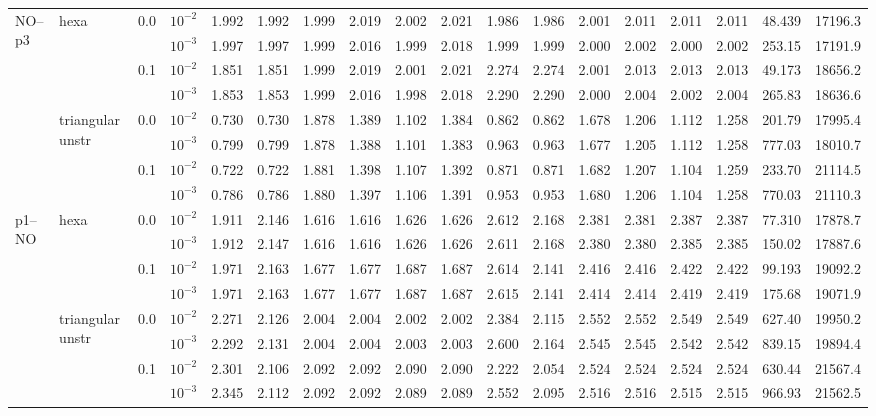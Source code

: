 \begin{longtable}{llclrrrrrrrrrrrrrr}
\multirow{8}{*}{NO--p3} & \multirow{4}{*}{hexa} & \multirow{2}{*}{0.0} & $10^{-2}$ & 1.992 & 1.992 & 1.999 & 2.019 & 2.002 & 2.021 & 1.986 & 1.986 & 2.001 & 2.011 & 2.011 & 2.011 & 48.439 & 17196.3 \\
& & & $10^{-3}$ & 1.997 & 1.997 & 1.999 & 2.016 & 1.999 & 2.018 & 1.999 & 1.999 & 2.000 & 2.002 & 2.000 & 2.002 & 253.15 & 17191.9 \\\cline{3-18}
& & \multirow{2}{*}{0.1} & $10^{-2}$ & 1.851 & 1.851 & 1.999 & 2.019 & 2.001 & 2.021 & 2.274 & 2.274 & 2.001 & 2.013 & 2.013 & 2.013 & 49.173 & 18656.2 \\
& & & $10^{-3}$ & 1.853 & 1.853 & 1.999 & 2.016 & 1.998 & 2.018 & 2.290 & 2.290 & 2.000 & 2.004 & 2.002 & 2.004 & 265.83 & 18636.6 \\\cline{2-18}
& \multirow{4}{*}{triangular unstr} & \multirow{2}{*}{0.0} & $10^{-2}$ & 0.730 & 0.730 & 1.878 & 1.389 & 1.102 & 1.384 & 0.862 & 0.862 & 1.678 & 1.206 & 1.112 & 1.258 & 201.79 & 17995.4 \\
& & & $10^{-3}$ & 0.799 & 0.799 & 1.878 & 1.388 & 1.101 & 1.383 & 0.963 & 0.963 & 1.677 & 1.205 & 1.112 & 1.258 & 777.03 & 18010.7 \\\cline{3-18}
& & \multirow{2}{*}{0.1} & $10^{-2}$ & 0.722 & 0.722 & 1.881 & 1.398 & 1.107 & 1.392 & 0.871 & 0.871 & 1.682 & 1.207 & 1.104 & 1.259 & 233.70 & 21114.5 \\
& & & $10^{-3}$ & 0.786 & 0.786 & 1.880 & 1.397 & 1.106 & 1.391 & 0.953 & 0.953 & 1.680 & 1.206 & 1.104 & 1.258 & 770.03 & 21110.3 \\\hline

\multirow{8}{*}{p1--NO} & \multirow{4}{*}{hexa} & \multirow{2}{*}{0.0} & $10^{-2}$ & 1.911 & 2.146 & 1.616 & 1.616 & 1.626 & 1.626 & 2.612 & 2.168 & 2.381 & 2.381 & 2.387 & 2.387 & 77.310 & 17878.7 \\
& & & $10^{-3}$ & 1.912 & 2.147 & 1.616 & 1.616 & 1.626 & 1.626 & 2.611 & 2.168 & 2.380 & 2.380 & 2.385 & 2.385 & 150.02 & 17887.6 \\\cline{3-18}
& & \multirow{2}{*}{0.1} & $10^{-2}$ & 1.971 & 2.163 & 1.677 & 1.677 & 1.687 & 1.687 & 2.614 & 2.141 & 2.416 & 2.416 & 2.422 & 2.422 & 99.193 & 19092.2 \\
& & & $10^{-3}$ & 1.971 & 2.163 & 1.677 & 1.677 & 1.687 & 1.687 & 2.615 & 2.141 & 2.414 & 2.414 & 2.419 & 2.419 & 175.68 & 19071.9 \\\cline{2-18}
& \multirow{4}{*}{triangular unstr} & \multirow{2}{*}{0.0} & $10^{-2}$ & 2.271 & 2.126 & 2.004 & 2.004 & 2.002 & 2.002 & 2.384 & 2.115 & 2.552 & 2.552 & 2.549 & 2.549 & 627.40 & 19950.2 \\
& & & $10^{-3}$ & 2.292 & 2.131 & 2.004 & 2.004 & 2.003 & 2.003 & 2.600 & 2.164 & 2.545 & 2.545 & 2.542 & 2.542 & 839.15 & 19894.4 \\\cline{3-18}
& & \multirow{2}{*}{0.1} & $10^{-2}$ & 2.301 & 2.106 & 2.092 & 2.092 & 2.090 & 2.090 & 2.222 & 2.054 & 2.524 & 2.524 & 2.524 & 2.524 & 630.44 & 21567.4 \\
& & & $10^{-3}$ & 2.345 & 2.112 & 2.092 & 2.092 & 2.089 & 2.089 & 2.552 & 2.095 & 2.516 & 2.516 & 2.515 & 2.515 & 966.93 & 21562.5 \\\hline


\end{longtable}
